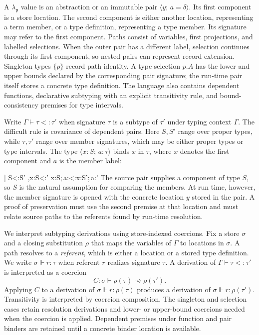 \documentclass[acmsmall,screen,nonacm]{acmart}
\newcommand{\ruleuse}[1]{%
  \hyperref[rule:#1]{\textsc{#1}}}
\newcommand{\lambdap}{\ensuremath{\lambda_{\mathsf p}}}
\newcommand{\sing}[1]{\{#1\}}
\newcommand{\pairty}[4]{\langle #1\!:\!#2;\,#3\!:\!#4\rangle}
\newcommand{\pairval}[3]{\langle #1;\,#2=#3\rangle}
\newcommand{\realizes}{\Vdash}
\newcommand{\coerce}{\mathrel{\rightsquigarrow}}
\newcommand{\rulesetup}{%
  \small
  \smallrulenames
  \setlength{\afterruleskip}{2em plus 0.2em minus 0.1em}%
  \setlength{\labelminsep}{0.6em}%
  \renewcommand{\arraystretch}{1.15}%
  \renewcommand{\andalso}{\qquad}%
}
\begin{document}
A \lambdap{} value is an abstraction or an immutable pair
\(\pairval{y}{a}{\delta}\). Its first component is a store location. The
second component is either another location, representing a term member, or
a type definition, representing a type member. Its signature may refer to the
first component. Paths consist of variables, first projections, and labelled
selections. When the outer pair has a different label, selection continues
through its first component, so nested pairs can represent record extension.
Singleton types \(\sing{p}\) record path identity. A type selection \(p.A\)
has the lower and upper bounds declared by the corresponding pair signature;
the run-time pair itself stores a concrete type definition. The language also
contains dependent functions, declarative subtyping with an explicit
transitivity rule, and bound-consistency premises for type intervals.

Write \(\Gamma\vdash\tau<:\tau'\) when signature \(\tau\) is a subtype of
\(\tau'\) under typing context \(\Gamma\). The difficult rule is covariance
of dependent pairs. Here \(S,S'\) range over proper types, while
\(\tau,\tau'\) range over member signatures, which may be either proper
types or type intervals. The type \(\pairty{x}{S}{a}{\tau}\) binds \(x\) in
\(\tau\), where \(x\) denotes the first component and \(a\) is the member
label:
\begingroup
\rulesetup
{}
\infrule[\ruleuse{s-pair}]
  {\Gamma\vdash S<:S'
   \andalso
   \Gamma,x:S\vdash \tau<:\tau'}
  {\Gamma\vdash
    \pairty{x}{S}{a}{\tau}<:\pairty{x}{S'}{a}{\tau'}}
\endgroup
The source pair supplies a component of type \(S\), so \(S\) is the natural
assumption for comparing the members. At run time, however, the member
signature is opened with the concrete location \(y\) stored in the pair. A
proof of preservation must use the second premise at that location and must
relate source paths to the referents found by run-time resolution.

We interpret subtyping derivations using store-indexed coercions. Fix a store
\(\sigma\) and a closing substitution \(\rho\) that maps the variables of
\(\Gamma\) to locations in \(\sigma\). A path resolves to a \emph{referent},
which is either a location or a stored type definition. We write
\(\sigma\realizes r:\tau\) when referent \(r\) realizes signature \(\tau\).
A derivation of \(\Gamma\vdash\tau<:\tau'\) is interpreted as a coercion
\[
  C:\sigma\vdash\rho(\tau)\coerce\rho(\tau').
\]
Applying \(C\) to a derivation of
\(\sigma\realizes r:\rho(\tau)\) produces a derivation of
\(\sigma\realizes r:\rho(\tau')\). Transitivity is interpreted by coercion
composition. The singleton and selection cases retain resolution derivations
and lower- or upper-bound coercions needed when the coercion is applied.
Dependent
premises under function and pair binders are retained until a concrete binder
location is available.
\end{document}
